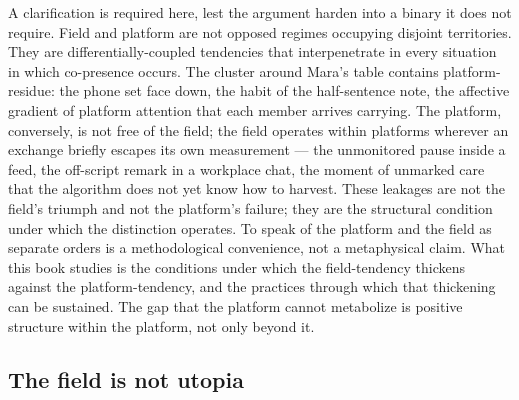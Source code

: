 A clarification is required here, lest the argument harden into a binary it does not require. Field and platform are not opposed regimes occupying disjoint territories. They are differentially-coupled tendencies that interpenetrate in every situation in which co-presence occurs. The cluster around Mara's table contains platform-residue: the phone set face down, the habit of the half-sentence note, the affective gradient of platform attention that each member arrives carrying. The platform, conversely, is not free of the field; the field operates within platforms wherever an exchange briefly escapes its own measurement --- the unmonitored pause inside a feed, the off-script remark in a workplace chat, the moment of unmarked care that the algorithm does not yet know how to harvest. These leakages are not the field's triumph and not the platform's failure; they are the structural condition under which the distinction operates. To speak of the platform and the field as separate orders is a methodological convenience, not a metaphysical claim. What this book studies is the conditions under which the field-tendency thickens against the platform-tendency, and the practices through which that thickening can be sustained. The gap that the platform cannot metabolize is positive structure within the platform, not only beyond it.

\subsection{The field is not utopia}

